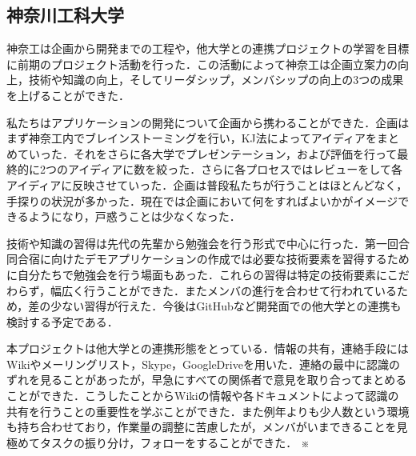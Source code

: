 \subsection{神奈川工科大学}
\par 神奈工は企画から開発までの工程や，他大学との連携プロジェクトの学習を目標に前期のプロジェクト活動を行った．この活動によって神奈工は企画立案力の向上，技術や知識の向上，そしてリーダシップ，メンバシップの向上の3つの成果を上げることができた．
\par 私たちはアプリケーションの開発について企画から携わることができた．企画はまず神奈工内でブレインストーミングを行い，KJ法によってアイディアをまとめていった．それをさらに各大学でプレゼンテーション，および評価を行って最終的に2つのアイディアに数を絞った．さらに各プロセスではレビューをして各アイディアに反映させていった．企画は普段私たちが行うことはほとんどなく，手探りの状況が多かった．現在では企画において何をすればよいかがイメージできるようになり，戸惑うことは少なくなった．
\par 技術や知識の習得は先代の先輩から勉強会を行う形式で中心に行った．第一回合同合宿に向けたデモアプリケーションの作成では必要な技術要素を習得するために自分たちで勉強会を行う場面もあった．これらの習得は特定の技術要素にこだわらず，幅広く行うことができた．またメンバの進行を合わせて行われているため，差の少ない習得が行えた．今後はGitHubなど開発面での他大学との連携も検討する予定である．
\par 本プロジェクトは他大学との連携形態をとっている．情報の共有，連絡手段にはWikiやメーリングリスト，Skype，GoogleDriveを用いた．連絡の最中に認識のずれを見ることがあったが，早急にすべての関係者で意見を取り合ってまとめることができた．こうしたことからWikiの情報や各ドキュメントによって認識の共有を行うことの重要性を学ぶことができた．また例年よりも少人数という環境も持ち合わせており，作業量の調整に苦慮したが，メンバがいまできることを見極めてタスクの振り分け，フォローをすることができた．
※
